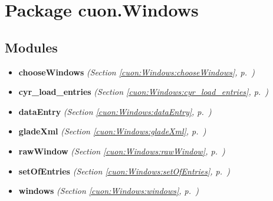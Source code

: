 %
%
%


\section{Package cuon.Windows}

    \label{cuon:Windows}


\subsection{Modules}

\begin{itemize}
\setlength{\parskip}{0ex}
\item \textbf{chooseWindows}
  \textit{(Section \ref{cuon:Windows:chooseWindows}, p.~\pageref{cuon:Windows:chooseWindows})}

\item \textbf{cyr\_load\_entries}
  \textit{(Section \ref{cuon:Windows:cyr_load_entries}, p.~\pageref{cuon:Windows:cyr_load_entries})}

\item \textbf{dataEntry}
  \textit{(Section \ref{cuon:Windows:dataEntry}, p.~\pageref{cuon:Windows:dataEntry})}

\item \textbf{gladeXml}
  \textit{(Section \ref{cuon:Windows:gladeXml}, p.~\pageref{cuon:Windows:gladeXml})}

\item \textbf{rawWindow}
  \textit{(Section \ref{cuon:Windows:rawWindow}, p.~\pageref{cuon:Windows:rawWindow})}

\item \textbf{setOfEntries}
  \textit{(Section \ref{cuon:Windows:setOfEntries}, p.~\pageref{cuon:Windows:setOfEntries})}

\item \textbf{windows}
  \textit{(Section \ref{cuon:Windows:windows}, p.~\pageref{cuon:Windows:windows})}

\end{itemize}

